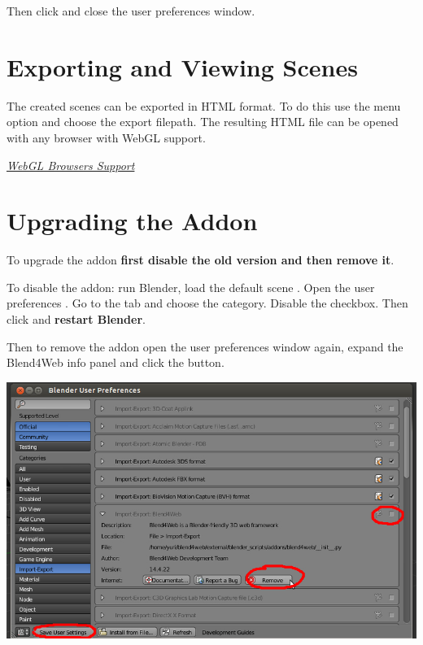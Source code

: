 \documentclass[a4paper,12pt,oneside]{sphinxmanual}
\begin{document}
\begin{DUlineblock}{0em}
\item[] 
\end{DUlineblock}

Then click  and close the user preferences window.


\section{Exporting and Viewing Scenes}
\label{first_steps:quick-install-export-viewer}\label{first_steps:id5}\label{first_steps:index-1}
The created scenes can be exported in HTML format. To do this use the  menu option and choose the export filepath. The resulting HTML file can be opened with any browser with WebGL support.




{\hyperref[about:browser-webgl-support]{\emph{WebGL Browsers Support}}}




\section{Upgrading the Addon}
\label{first_steps:id6}\label{first_steps:quick-install-addon-upgrade}\label{first_steps:index-2}
To upgrade the addon \textbf{first disable the old version and then remove it}.

To disable the addon: run Blender, load the default scene . Open the user preferences . Go to the  tab and choose the  category. Disable the  checkbox. Then click  and \textbf{restart Blender}.

Then to remove the addon open the user preferences window again, expand the Blend4Web info panel and click the  button.

{\hfill\includegraphics[width=1.000\linewidth]{user_preferences_disable_addon.jpg}\hfill}
\end{document}
